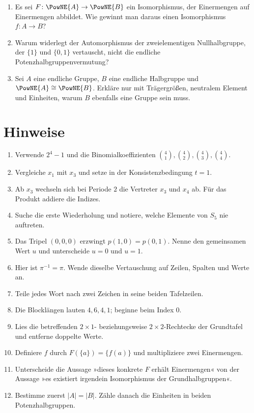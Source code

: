 \documentclass[main.tex]{subfiles}
\begin{document}
\begin{enumerate}
  \item Es sei \(F\colon\PowNE{A}\to\PowNE{B}\) ein Isomorphismus, der
    Einermengen auf Einermengen abbildet.  Wie gewinnt man daraus einen
    Isomorphismus \(f\colon A\to B\)?

  \item Warum widerlegt der Automorphismus der zweielementigen
    Nullhalbgruppe, der \(\{1\}\) und \(\{0,1\}\) vertauscht, nicht die
    endliche Potenzhalbgruppenvermutung?

  \item Sei \(A\) eine endliche Gruppe, \(B\) eine endliche Halbgruppe und
    \(\PowNE{A}\cong\PowNE{B}\).  Erkläre nur mit Trägergrößen, neutralem
    Element und Einheiten, warum \(B\) ebenfalls eine Gruppe sein muss.
\end{enumerate}

\clearpage
\section{Hinweise}

\begin{enumerate}
  \item Verwende \(2^4-1\) und die Binomialkoeffizienten
    \(\binom41,\binom42,\binom43,\binom44\).
  \item Vergleiche \(x_1\) mit \(x_3\) und setze in der
    Konsistenzbedingung \(t=1\).
  \item Ab \(x_3\) wechseln sich bei Periode \(2\) die Vertreter \(x_3\)
    und \(x_4\) ab.  Für das Produkt addiere die Indizes.
  \item Suche die erste Wiederholung und notiere, welche Elemente von
    \(S_5\) nie auftreten.
  \item Das Tripel \((0,0,0)\) erzwingt
    \(p(1,0)=p(0,1)\).  Nenne den gemeinsamen Wert \(u\) und unterscheide
    \(u=0\) und \(u=1\).
  \item Hier ist \(\pi^{-1}=\pi\).  Wende dieselbe Vertauschung auf Zeilen,
    Spalten und Werte an.
  \item Teile jedes Wort nach zwei Zeichen in seine beiden Tafelzeilen.
  \item Die Blocklängen lauten \(4,6,4,1\); beginne beim Index \(0\).
  \item Lies die betreffenden \(2\times1\)- beziehungsweise
    \(2\times2\)-Rechtecke der Grundtafel und entferne doppelte Werte.
  \item Definiere \(f\) durch \(F(\{a\})=\{f(a)\}\) und multipliziere zwei
    Einermengen.
  \item Unterscheide die Aussage »dieses konkrete \(F\) erhält
    Einermengen« von der Aussage »es existiert irgendein Isomorphismus der
    Grundhalbgruppen«.
  \item Bestimme zuerst \(|A|=|B|\).  Zähle danach die Einheiten in beiden
    Potenzhalbgruppen.
\end{enumerate}
\end{document}
